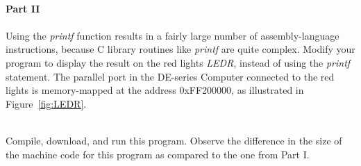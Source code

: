 \documentclass[epsfig,10pt,fullpage]{article}
\begin{document}
~\\
\noindent
{\bf Part II}
~\\
~\\
\noindent
Using the {\it printf} function results in a fairly large number of assembly-language instructions,
because C library routines like {\it printf} are quite complex. Modify your program to display the 
result on the red lights {\it LEDR}, instead of using the {\it printf} statement. The
parallel port in the DE-series Computer connected to the red lights is memory-mapped at the 
address {\sf 0xFF200000}, as illustrated in Figure~\ref{fig:LEDR}.

~\\
\noindent
Compile, download, and run this program. Observe the difference in the size of the
machine code for this program as compared to the one from Part I.
\end{document}
